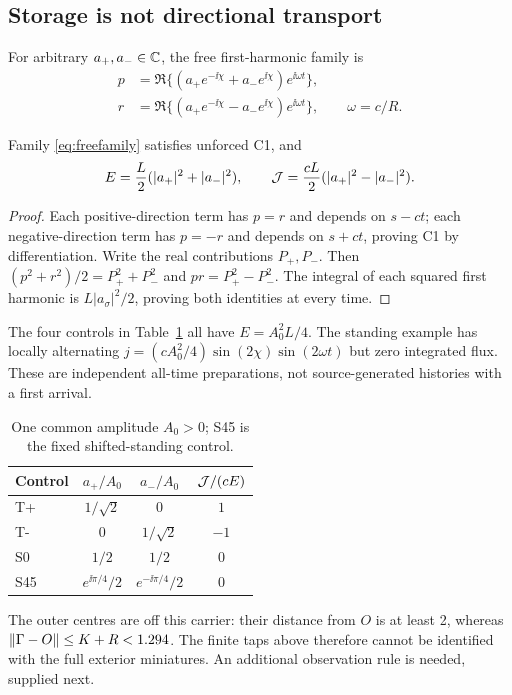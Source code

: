 \subsection{Storage is not directional transport}
For arbitrary $a_+,a_-\in\mathbb C$, the free first-harmonic family is
\begin{equation}\label{eq:freefamily}
 \begin{aligned}
 p&=\Re\{(a_+e^{-\ii\chi}+a_-e^{\ii\chi})e^{\ii\omega t}\},\\
 r&=\Re\{(a_+e^{-\ii\chi}-a_-e^{\ii\chi})e^{\ii\omega t}\},\qquad\omega=c/R.
 \end{aligned}
\end{equation}
\begin{proposition}\label{prop:freeenergy}
Family \eqref{eq:freefamily} satisfies unforced C1, and
\begin{equation}\label{eq:freeenergy}
 E=\frac L2(|a_+|^2+|a_-|^2),\qquad
 \mathcal J=\frac{cL}{2}(|a_+|^2-|a_-|^2).
\end{equation}
\end{proposition}
\begin{proof}
Each positive-direction term has $p=r$ and depends on $s-ct$; each negative-direction term has $p=-r$ and depends on $s+ct$, proving C1 by differentiation. Write the real contributions $P_+,P_-$. Then $(p^2+r^2)/2=P_+^2+P_-^2$ and $pr=P_+^2-P_-^2$. The integral of each squared first harmonic is $L|a_\sigma|^2/2$, proving both identities at every time.
\end{proof}
The four controls in Table~\ref{tab:free} all have $E=A_0^2L/4$. The standing example has locally alternating $j=(cA_0^2/4)\sin(2\chi)\sin(2\omega t)$ but zero integrated flux. These are independent all-time preparations, not source-generated histories with a first arrival.
\begin{table}[htbp]\centering
\begin{tabular}{lccc}\toprule
Control & $a_+/A_0$ & $a_-/A_0$ & $\mathcal J/(cE)$\\\midrule
T+ & $1/\sqrt2$ & $0$ & $1$\\
T- & $0$ & $1/\sqrt2$ & $-1$\\
S0 & $1/2$ & $1/2$ & $0$\\
S45 & $e^{\ii\pi/4}/2$ & $e^{-\ii\pi/4}/2$ & $0$\\\bottomrule
\end{tabular}
\caption{One common amplitude $A_0>0$; S45 is the fixed shifted-standing control.}\label{tab:free}
\end{table}
The outer centres are off this carrier: their distance from $O$ is at least 2, whereas $\lVert\Gamma-O\rVert\le K+R<1.294$. The finite taps above therefore cannot be identified with the full exterior miniatures. An additional observation rule is needed, supplied next.
